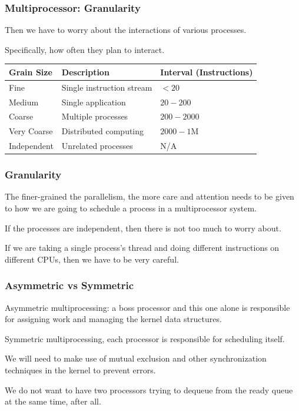 \begin{frame}
\frametitle{Multiprocessor: Granularity}

Then we have to worry about the interactions of various processes.

Specifically, how often they plan to interact.

\begin{center}
\begin{tabular}{l|l|l}
	\textbf{Grain Size} & \textbf{Description} & \textbf{Interval (Instructions)}\\ \hline
	Fine & Single instruction stream & $< 20$ \\\hline
	Medium & Single application & $20 - 200$ \\\hline
	Coarse & Multiple processes & $200 - 2000$ \\\hline
	Very Coarse & Distributed computing & $2000 - 1$M \\\hline
	Independent & Unrelated processes & N/A \\

\end{tabular}
\end{center}

\end{frame}

\begin{frame}
\frametitle{Granularity}

The finer-grained the parallelism, the more care and attention needs to be given to how we are going to schedule a process in a multiprocessor system. 

If the processes are independent, then there is not too much to worry about. 

If we are taking a single process's thread and doing different instructions on different CPUs, then we have to be very careful.

\end{frame}

\begin{frame}
\frametitle{Asymmetric vs Symmetric}
Asymmetric multiprocessing: a boss processor and this one alone is responsible for assigning work and managing the kernel data structures. 

Symmetric multiprocessing, each processor is responsible for scheduling itself. 

We will need to make use of mutual exclusion and other synchronization techniques in the kernel to prevent errors.

We do not want to have two processors trying to dequeue from the ready queue at the same time, after all.

\end{frame}

